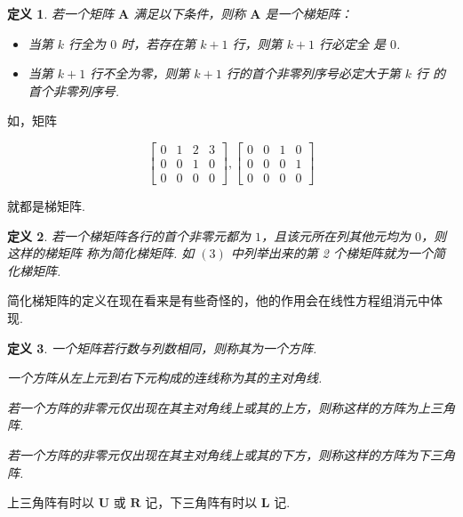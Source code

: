 \documentclass[a4paper]{article}
\newtheorem{definition}{定义}[section]
\begin{document}
\begin{definition}
    若一个矩阵 $\boldsymbol A$ 满足以下条件，则称 $\boldsymbol A$ 是一个梯矩阵：
    \begin{itemize}
        \item 当第 $k$ 行全为 $0$ 时，若存在第 $k+1$ 行，则第 $k+1$ 行必定全
              是 $0$.
        \item 当第 $k+1$ 行不全为零，则第 $k+1$ 行的首个非零列序号必定大于第 $k$ 行
              的首个非零列序号.
    \end{itemize}
\end{definition}

如，矩阵

\begin{equation}
    \begin{bmatrix}
        0 & 1 & 2 & 3 \\
        0 & 0 & 1 & 0 \\
        0 & 0 & 0 & 0
    \end{bmatrix},
    \begin{bmatrix}
        0 & 0 & 1 & 0 \\
        0 & 0 & 0 & 1 \\
        0 & 0 & 0 & 0
    \end{bmatrix}
\end{equation}

就都是梯矩阵.

\begin{definition}
    若一个梯矩阵各行的首个非零元都为 $1$，且该元所在列其他元均为 $0$，则这样的梯矩阵
    称为简化梯矩阵. 如 $(3)$ 中列举出来的第 2 个梯矩阵就为一个简化梯矩阵.
\end{definition}

简化梯矩阵的定义在现在看来是有些奇怪的，他的作用会在线性方程组消元中体现.

\begin{definition}
    一个矩阵若行数与列数相同，则称其为一个方阵.

    一个方阵从左上元到右下元构成的连线称为其的主对角线.

    若一个方阵的非零元仅出现在其主对角线上或其的上方，则称这样的方阵为上三角阵.

    若一个方阵的非零元仅出现在其主对角线上或其的下方，则称这样的方阵为下三角阵.
\end{definition}

上三角阵有时以 $\boldsymbol U$ 或 $\boldsymbol R$ 记，下三角阵有时以 $\boldsymbol
    L$ 记.
\end{document}
